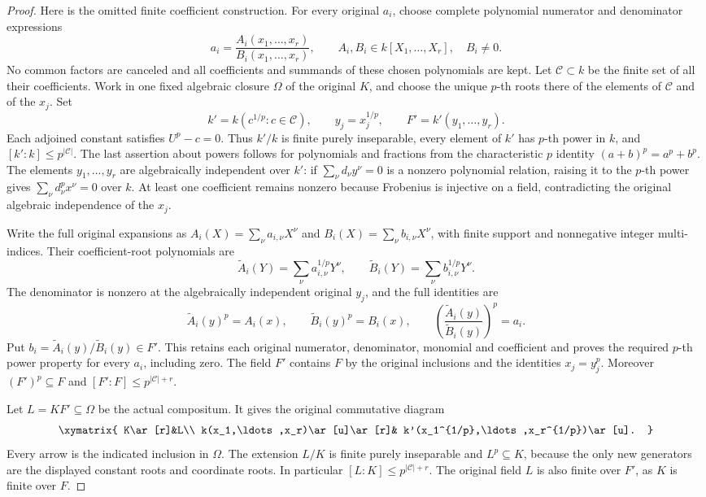 \begin{proof}
Here is the omitted finite coefficient construction.
For every original $a_i$, choose complete polynomial
numerator and denominator expressions
$$
a_i=\frac{A_i(x_1,\ldots,x_r)}{B_i(x_1,\ldots,x_r)},
\qquad A_i,B_i\in k[X_1,\ldots,X_r],\quad B_i\ne0.
$$
No common factors are canceled and all coefficients
and summands of these chosen polynomials are kept.
Let $\mathcal C\subset k$ be the finite set of
all their coefficients. Work in one fixed
algebraic closure $\Omega$ of the original $K$,
and choose the unique $p$-th roots there of
the elements of $\mathcal C$ and of the $x_j$.
Set
$$
k'=k(c^{1/p}:c\in\mathcal C),\qquad
y_j=x_j^{1/p},\qquad
F'=k'(y_1,\ldots,y_r).
$$
Each adjoined constant satisfies $U^p-c=0$.
Thus $k'/k$ is finite purely inseparable,
every element of $k'$ has $p$-th power in $k$,
and $[k':k]\leq p^{|\mathcal C|}$.
The last assertion about powers follows for
polynomials and fractions from the characteristic
$p$ identity $(a+b)^p=a^p+b^p$.
The elements $y_1,\ldots,y_r$ are algebraically
independent over $k'$: if
$\sum_\nu d_\nu y^\nu=0$ is a nonzero polynomial
relation, raising it to the $p$-th power gives
$\sum_\nu d_\nu^p x^\nu=0$ over $k$.
At least one coefficient remains nonzero because
Frobenius is injective on a field, contradicting
the original algebraic independence of the $x_j$.

Write the full original expansions as
$A_i(X)=\sum_\nu a_{i,\nu}X^\nu$ and
$B_i(X)=\sum_\nu b_{i,\nu}X^\nu$, with finite
support and nonnegative integer multi-indices.
Their coefficient-root polynomials are
$$
\widetilde A_i(Y)=\sum_\nu a_{i,\nu}^{1/p}Y^\nu,
\qquad
\widetilde B_i(Y)=\sum_\nu b_{i,\nu}^{1/p}Y^\nu.
$$
The denominator is nonzero at the algebraically
independent original $y_j$, and the full identities
are
$$
\widetilde A_i(y)^p=A_i(x),\qquad
\widetilde B_i(y)^p=B_i(x),\qquad
\left(\frac{\widetilde A_i(y)}{\widetilde B_i(y)}\right)^p=a_i.
$$
Put $b_i=\widetilde A_i(y)/\widetilde B_i(y)\in F'$.
This retains each original numerator, denominator,
monomial and coefficient and proves the required
$p$-th power property for every $a_i$, including zero.
The field $F'$ contains $F$ by the original
inclusions and the identities $x_j=y_j^p$.
Moreover $(F')^p\subseteq F$ and
$[F':F]\leq p^{|\mathcal C|+r}$.

Let $L=KF'\subseteq\Omega$ be the actual compositum.
It gives the original commutative diagram
$$
\xymatrix{
K\ar[r]&L\\
k(x_1,\ldots,x_r)\ar[u]\ar[r]&
k'(x_1^{1/p},\ldots,x_r^{1/p})\ar[u].
}
$$
Every arrow is the indicated inclusion in $\Omega$.
The extension $L/K$ is finite purely inseparable
and $L^p\subseteq K$, because the only new
generators are the displayed constant roots
and coordinate roots. In particular
$[L:K]\leq p^{|\mathcal C|+r}$.
The original field $L$ is also finite over $F'$,
as $K$ is finite over $F$.


\end{proof}
